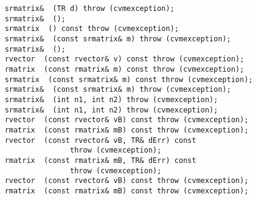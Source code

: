 \verb"    srmatrix& "\verb" (TR d) throw (cvmexception);"\\
\verb"    srmatrix& "\verb" ();"\\
\verb"    srmatrix "\verb" () const throw (cvmexception);"\\
\verb"    srmatrix& "\verb" (const srmatrix& m) throw (cvmexception);"\\
\verb"    srmatrix& "\verb" ();"\\
\verb"    rvector "\verb" (const rvector& v) const throw (cvmexception);"\\
\verb"    rmatrix "\verb" (const rmatrix& m) const throw (cvmexception);"\\
\verb"    srmatrix "\verb" (const srmatrix& m) const throw (cvmexception);"\\
\verb"    srmatrix& "\verb" (const srmatrix& m) throw (cvmexception);"\\
\verb"    srmatrix& "\verb" (int n1, int n2) throw (cvmexception);"\\
\verb"    srmatrix& "\verb" (int n1, int n2) throw (cvmexception);"\\
\verb"    rvector "\verb" (const rvector& vB) const throw (cvmexception);"\\
\verb"    rmatrix "\verb" (const rmatrix& mB) const throw (cvmexception);"\\
\verb"    rvector "\verb" (const rvector& vB, TR& dErr) const"\\
\verb"                   throw (cvmexception);"\\
\verb"    rmatrix "\verb" (const rmatrix& mB, TR& dErr) const"\\
\verb"                   throw (cvmexception);"\\
\verb"    rvector "\verb" (const rvector& vB) const throw (cvmexception);"\\
\verb"    rmatrix "\verb" (const rmatrix& mB) const throw (cvmexception);"\\

